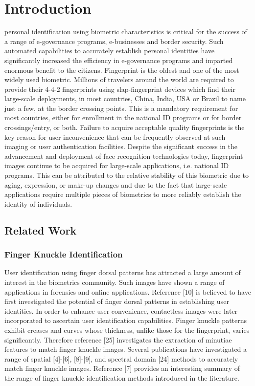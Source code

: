 \hiddenref{}

\section{Introduction\label{introduction}}

 personal identification using biometric characteristics is critical for the success of a range of e-governance programs, e-businesses and border security. Such automated capabilities to accurately establish personal identities have significantly increased the efficiency in e-governance programs and imparted enormous benefit to the citizens. Fingerprint is the oldest and one of the most widely used biometric. Millions of travelers around the world are required to provide their 4-4-2 fingerprints using slap-fingerprint devices which find their large-scale deployments, in most countries, China, India, USA or Brazil to name just a few, at the border crossing points. This is a mandatory requirement for most countries, either for enrollment in the national ID programs or for border crossings/entry, or both. Failure to acquire acceptable quality fingerprints is the key reason for user inconvenience that can be frequently observed at such imaging or user authentication facilities. Despite the significant success in the advancement and deployment of face recognition technologies today, fingerprint images continue to be acquired for large-scale applications, i.e. national ID programs. This can be attributed to the relative stability of this biometric due to aging, expression, or make-up changes and due to the fact that large-scale applications require multiple pieces of biometrics to more reliably establish the identity of individuals.

\subsection{Related Work}
\subsubsection{Finger Knuckle Identification} 
User identification using finger dorsal patterns has attracted a large amount of interest in the biometrics community. Such images have shown a range of applications in forensics and online applications. Reference [10] is believed to have first investigated the potential of finger dorsal patterns in establishing user identities. In order to enhance user convenience, contactless images were later incorporated to ascertain user identification capabilities. Finger knuckle patterns exhibit creases and curves whose thickness, unlike those for the fingerprint, varies significantly. Therefore reference [25] investigates the extraction of minutiae features to match finger knuckle images. Several publications have investigated a range of spatial [4]-[6], [8]-[9], and spectral domain [24] methods to accurately match finger knuckle images. Reference [7] provides an interesting summary of the range of finger knuckle identification methods introduced in the literature. 
